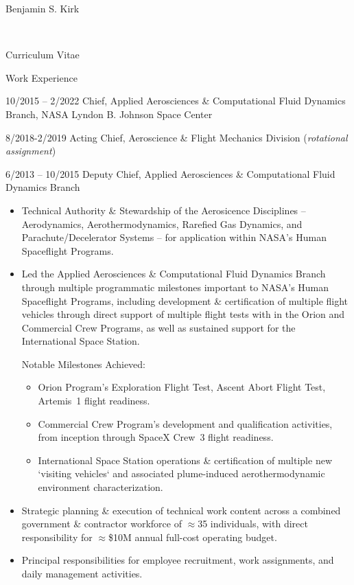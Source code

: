 \documentclass[10pt]{report}
\begin{document}
\begin{cv}{\centerline{\Large Benjamin S. Kirk}\\
    \centerline{\large Curriculum Vitae}}
  \vspace{-.5em}
  \begin{cvlist}{Work Experience}
  \item[10/2015 -- 2/2022]
    Chief, Applied Aerosciences \& Computational Fluid Dynamics Branch,  NASA Lyndon B. Johnson Space Center
  \item[8/2018-2/2019]
    Acting Chief, Aeroscience \& Flight Mechanics Division (\emph{rotational assignment})
  \item[6/2013 -- 10/2015]
    Deputy Chief, Applied Aerosciences \& Computational Fluid Dynamics Branch
    \begin{itemize}
    \item
      Technical Authority \& Stewardship of the Aerosicence Disciplines -- Aerodynamics, Aerothermodynamics, Rarefied Gas Dynamics, and Parachute/Decelerator Systems -- for application within NASA's Human Spaceflight Programs.
    \item
      Led the Applied Aerosciences \& Computational Fluid Dynamics Branch through multiple programmatic milestones important to NASA's Human Spaceflight Programs, including development \& certification of multiple flight vehicles through direct support of multiple flight tests with in the Orion and Commercial Crew Programs, as well as sustained support for the International Space Station.

      Notable Milestones Achieved:
      \begin{itemize}
      \item Orion Program's Exploration Flight Test, Ascent Abort Flight Test, Artemis~1 flight readiness.
      \item Commercial Crew Program's development and qualification activities, from inception through SpaceX Crew~3 flight readiness.
      \item International Space Station operations \& certification of multiple new `visiting vehicles` and associated plume-induced aerothermodynamic environment characterization.
      \end{itemize}

    \item
      Strategic planning \& execution of technical work content across a combined government \& contractor workforce of $\approx$35 individuals, with direct responsibility for $\approx$\$10M annual full-cost operating budget.

    \item
      Principal responsibilities for employee recruitment, work assignments, and daily management activities.
    \end{itemize}



\end{cvlist}
\end{cv}
\end{document}
